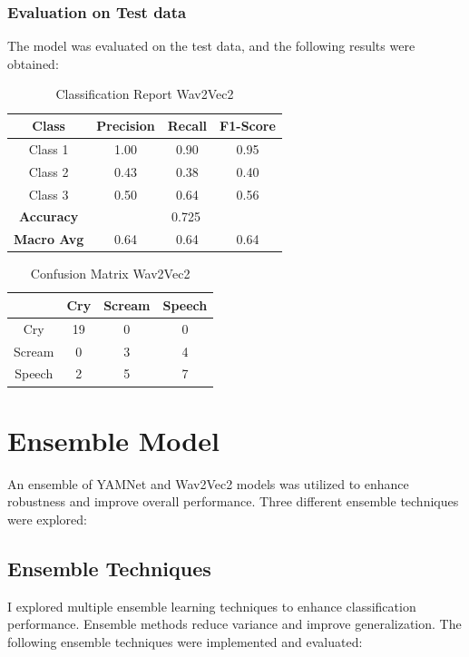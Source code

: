 \documentclass[conference]{IEEEtran}
\begin{document}
\subsubsection*{Evaluation on Test data}
The model was evaluated on the test data, and the following results were obtained:
\begin{table}[htbp]
\caption{Classification Report Wav2Vec2}
\begin{center}
\begin{tabular}{|c|c|c|c|}
\hline
\textbf{Class} & \textbf{Precision} & \textbf{Recall} & \textbf{F1-Score} \\
\hline
Class 1 & 1.00 & 0.90 & 0.95 \\
\hline
Class 2 & 0.43 & 0.38 & 0.40 \\
\hline
Class 3 & 0.50 & 0.64 & 0.56 \\
\hline
\textbf{Accuracy} & \multicolumn{3}{|c|}{0.725} \\
\hline
\textbf{Macro Avg} & 0.64 & 0.64 & 0.64 \\
\hline
\end{tabular}
\label{tab:classification_report_wav2vec2}
\end{center}
\end{table}

\begin{table}[htbp]
\caption{Confusion Matrix Wav2Vec2}
\begin{center}
\begin{tabular}{|c|c|c|c|}
\hline
& \textbf{Cry} & \textbf{Scream} & \textbf{Speech} \\
\hline
Cry & 19 & 0 & 0 \\
\hline
Scream & 0 & 3 & 4 \\
\hline
Speech & 2 & 5 & 7 \\
\hline
\end{tabular}
\label{tab:confusion_matrix_wav2vec2}
\end{center}
\end{table}



\section{Ensemble Model}
An ensemble of YAMNet and Wav2Vec2 models was utilized to enhance robustness and improve overall performance. Three different ensemble techniques were explored:
\subsection{Ensemble Techniques}
I explored multiple ensemble learning techniques to enhance classification performance. Ensemble methods reduce variance and improve generalization. The following ensemble techniques were implemented and evaluated:
\end{document}

